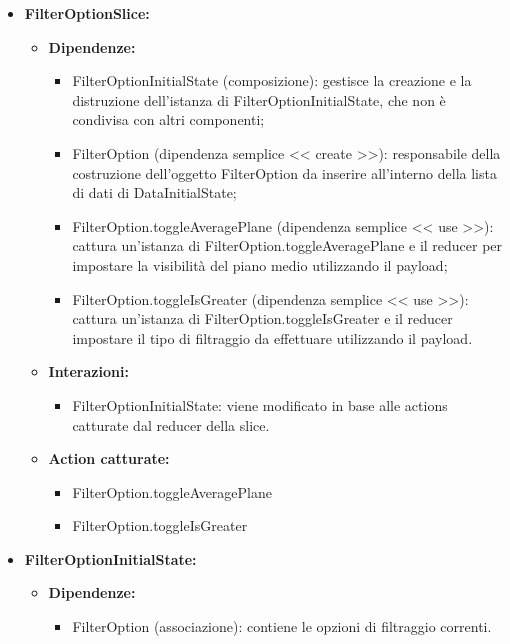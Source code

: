 \begin{itemize}
    \item \textbf{FilterOptionSlice:}
    \begin{itemize}
        \item \textbf{Dipendenze:}
        \begin{itemize}
            \item FilterOptionInitialState (composizione): gestisce la creazione e la distruzione dell'istanza di FilterOptionInitialState, che non è condivisa con altri componenti;
            \item FilterOption (dipendenza semplice << create >>): responsabile della costruzione dell'oggetto FilterOption da inserire all’interno della lista di dati di DataInitialState;
            \item FilterOption.toggleAveragePlane (dipendenza semplice << use >>): cattura un’istanza di FilterOption.toggleAveragePlane e il reducer per impostare la visibilità del piano medio utilizzando il payload;
            \item FilterOption.toggleIsGreater (dipendenza semplice << use >>): cattura un’istanza di FilterOption.toggleIsGreater e il reducer impostare il tipo di filtraggio da effettuare utilizzando il payload.
        \end{itemize} 
        \item \textbf{Interazioni:}
        \begin{itemize}
            \item FilterOptionInitialState: viene modificato in base alle actions catturate dal reducer della slice.
        \end{itemize} 
        \item \textbf{Action catturate:}
        \begin{itemize}
            \item FilterOption.toggleAveragePlane
            \item FilterOption.toggleIsGreater
        \end{itemize} 
    \end{itemize}

    \item \textbf{FilterOptionInitialState:}
    \begin{itemize}
        \item \textbf{Dipendenze:}
        \begin{itemize}
            \item FilterOption (associazione): contiene le opzioni di filtraggio correnti.
        \end{itemize} 
    \end{itemize}


\end{itemize}
